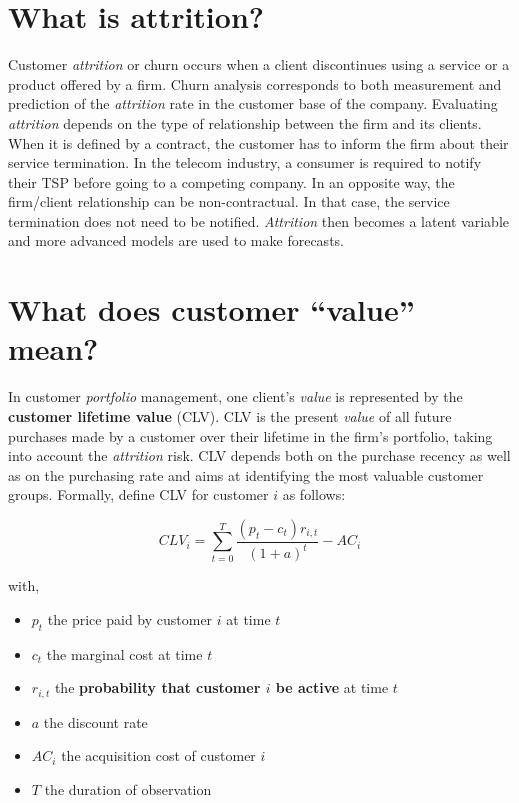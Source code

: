 \documentclass[
]{book}
\providecommand{\tightlist}{%
  \setlength{\itemsep}{0pt}\setlength{\parskip}{0pt}}
\begin{document}
\hypertarget{attritiondef}{%
\section{What is attrition?}\label{attritiondef}}

Customer \emph{attrition} or churn occurs when a client discontinues using a service or a product offered by a firm. Churn analysis corresponds to both measurement and prediction of the \emph{attrition} rate in the customer base of the company. Evaluating \emph{attrition} depends on the type of relationship between the firm and its clients. When it is defined by a contract, the customer has to inform the firm about their service termination. In the telecom industry, a consumer is required to notify their TSP before going to a competing company. In an opposite way, the firm/client relationship can be non-contractual. In that case, the service termination does not need to be notified. \emph{Attrition} then becomes a latent variable and more advanced models are used to make forecasts.

\hypertarget{valuedef}{%
\section{What does customer ``value'' mean?}\label{valuedef}}

In customer \emph{portfolio} management, one client's \emph{value} is represented by the \textbf{customer lifetime value} (CLV). CLV is the present \emph{value} of all future purchases made by a customer over their lifetime in the firm's portfolio, taking into account the \emph{attrition} risk. CLV depends both on the purchase recency as well as on the purchasing rate and aims at identifying the most valuable customer groups. Formally, \citet{CUSTOMERS_ASSETS} define CLV for customer \(i\) as follows:

\begin{equation}
  CLV_i = \sum_{t=0}^{T} \frac{(p_t - c_t)r_{i,t}}{(1+a)^t} - AC_i
  \label{eq:clv}
\end{equation}

with,

\begin{itemize}
\tightlist
\item
  \(p_t\) the price paid by customer \(i\) at time \(t\)
\item
  \(c_t\) the marginal cost at time \(t\)
\item
  \(r_{i,t}\) the \textbf{probability that customer \(i\) be active} at time \(t\)
\item
  \(a\) the discount rate
\item
  \(AC_i\) the acquisition cost of customer \(i\)
\item
  \(T\) the duration of observation
\end{itemize}
\end{document}
